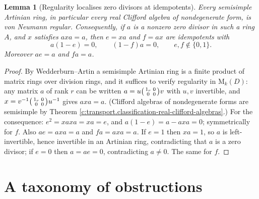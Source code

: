 \documentclass[11pt]{article}
\newtheorem{lemma}[theorem]{Lemma}
\theoremstyle{definition}
\theoremstyle{plain}
\providecommand{\Mat}{}\renewcommand{\Mat}{\mathrm{M}}
\begin{document}
\begin{lemma}[Regularity localises zero divisors at idempotents]\label{c:transport.regularity-localises-zero-divisors-idempotents}
Every semisimple Artinian ring, in particular every real Clifford algebra of nondegenerate form, is von Neumann regular. Consequently, if $a$ is a nonzero zero divisor in such a ring $A$, and $x$ satisfies $axa = a$, then $e = xa$ and $f = ax$ are idempotents with
\[
a(1 - e) = 0, \qquad (1 - f)a = 0, \qquad e, f \notin \{0, 1\}.
\]
Moreover $ae = a$ and $fa = a$.
\end{lemma}
\begin{proof}
By Wedderburn--Artin a semisimple Artinian ring is a finite product of matrix rings over division rings, and it suffices to verify regularity in $\Mat_k(D)$: any matrix $a$ of rank $r$ can be written $a = u \begin{psmallmatrix} 1_r & 0 \\ 0 & 0\end{psmallmatrix} v$ with $u, v$ invertible, and $x = v^{-1} \begin{psmallmatrix} 1_r & 0 \\ 0 & 0 \end{psmallmatrix} u^{-1}$ gives $axa = a$. (Clifford algebras of nondegenerate forms are semisimple by Theorem \ref{c:transport.classification-real-clifford-algebras}.) For the consequence: $e^2 = xaxa = xa = e$, and $a(1-e) = a - axa = 0$; symmetrically for $f$. Also $ae = axa = a$ and $fa = axa = a$. If $e = 1$ then $xa = 1$, so $a$ is left-invertible, hence invertible in an Artinian ring, contradicting that $a$ is a zero divisor; if $e = 0$ then $a = ae = 0$, contradicting $a \neq 0$. The same for $f$.

\end{proof}

\section{A taxonomy of obstructions}
\end{document}
